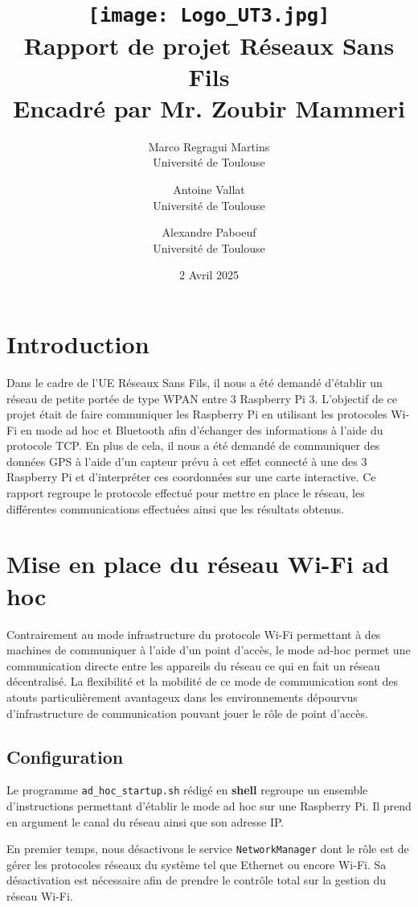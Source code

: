 \documentclass[a4paper,11pt]{article}
\title{
\texttt{[image: Logo\_UT3.jpg]}\\[4cm]
\huge {Rapport de projet Réseaux Sans Fils} \\ [1 cm]
\large{Encadré par Mr. Zoubir Mammeri} \\ [10cm]
}
\author{
    Marco Regragui Martins\\
    Université de Toulouse
    \and
    Antoine Vallat\\
    Université de Toulouse
    \and
    Alexandre Paboeuf\\
    Université de Toulouse
}
\date{2 Avril 2025}
\begin{document}
\maketitle
\tableofcontents
\pagebreak

\section{Introduction}
Dans le cadre de l’UE Réseaux Sans Fils, il nous a été demandé d’établir un réseau de petite portée de type WPAN entre 3 Raspberry Pi 3. L’objectif de ce projet était de faire communiquer les Raspberry Pi en utilisant les protocoles Wi-Fi en mode ad hoc et Bluetooth afin d’échanger des informations à l’aide du protocole TCP. En plus de cela, il nous a été demandé de communiquer des données GPS à l’aide d’un capteur prévu à cet effet connecté à une des 3 Raspberry Pi et d’interpréter ces coordonnées sur une carte interactive. Ce rapport regroupe le protocole effectué pour mettre en place le réseau, les différentes communications effectuées ainsi que les résultats obtenus.

\section{Mise en place du réseau Wi-Fi ad hoc}
Contrairement au mode infrastructure du protocole Wi-Fi permettant à des machines de communiquer à l’aide d’un point d’accès, le mode ad-hoc permet une communication directe entre les appareils du réseau ce qui en fait un réseau décentralisé. La flexibilité et la mobilité de ce mode de communication sont des atouts particulièrement avantageux dans les environnements dépourvus d’infrastructure de communication pouvant jouer le rôle de point d'accès. 

\subsection{Configuration}

Le programme \texttt{ad\_hoc\_startup.sh} rédigé en \textbf{shell} regroupe un ensemble d'instructions permettant d'établir le mode ad hoc sur une Raspberry Pi. Il prend en argument le canal du réseau ainsi que son adresse IP.

\quad 

En premier temps, nous désactivons le service \texttt{NetworkManager} dont le rôle est de gérer les protocoles réseaux du système tel que Ethernet ou encore Wi-Fi. Sa désactivation est nécessaire afin de prendre le contrôle total sur la gestion du réseau Wi-Fi. 
\end{document}

